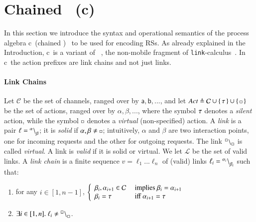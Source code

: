 
\section{Chained \CNA \ (c\CNA)}
\label{sec:ccna}

In this section we introduce  the syntax and operational semantics
of the process algebra c\CNA\  (chained \CNA)~\cite{BBF19} to be used for encoding RSs.
As already explained in the Introduction, c\CNA\ is a variant of \CNA~\cite{BBB17}, the non-mobile
fragment of {\tt link}-calculus~\cite{BodeiBB12,BODEI2020104587}.
In c\CNA\  the action prefixes are link chains and not just links.

\paragraph{Link Chains}
Let $\mathcal{C}$ be the set of channels, ranged over by $\mathsf{a},\mathsf{b},...$, and 
let $\mathit{Act} \triangleq \mathcal{C} \cup \{\, \tau \,\} \cup \{\, {\scriptstyle \square} \,\}$ be the set of actions, ranged over by $\alpha,\beta,...$,
where the symbol $\tau$ denotes a \emph{silent} action, while the symbol $\scriptstyle {\square}$ denotes a \emph{virtual} (non-specified) action.
A \emph{link} is a pair $\ell={}^{\alpha} \backslash_{\beta}^{}$;
it is \emph{solid} if $\alpha,\beta \neq \ \noacts$; 
intuitively, $\alpha$ and $\beta$ are two interaction points, one for incoming requests and the other for outgoing requests.
The link ${}^{\scriptstyle {\square}} \backslash_{\scriptstyle {\square}}^{}$ is called \emph{virtual}.
A link is \emph{valid} if it is solid or virtual.
We let $\mathcal{L}$ be the set of valid links.
%
A \emph{link chain} is a 
finite sequence $v = \ell_{1}...\ell_{n}$ of (valid) links  $\ell_{i} = {}^{\alpha_{i}} \backslash_{\beta_{i}}^{}$ such that:
\begin{enumerate}
\item for any $i\in [1,n-1]$, 
$\left\{\begin{array}{ll}
\beta_{i},\alpha_{i+1}\in \mathcal{C} & \mbox{ implies } \beta_{i} = \alpha_{i+1}\\
\beta_{i}=\tau & \mbox{ iff } \alpha_{i+1}=\tau
\end{array}\right.
$
\item  $\exists i \in [1,n]. \ \ell_i \neq {}^{\scriptstyle {\square}} \backslash_{\scriptstyle {\square}}^{}$.
\end{enumerate}

